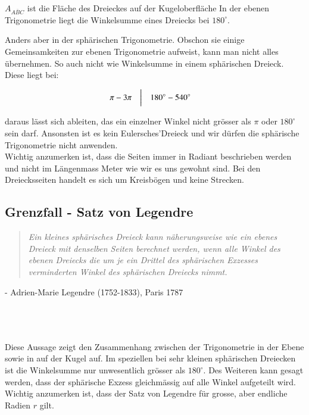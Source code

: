 \begin{refsection}
$A_{ \overline{ ABC }}$ ist die Fläche des Dreieckes auf der Kugeloberfläche
In der ebenen Trigonometrie liegt die Winkelsumme eines Dreiecks bei
$180^{\circ}$.

Anders aber in der sphärischen Trigonometrie. Obschon sie einige Gemeinsamkeiten zur ebenen Trigonometrie aufweist, kann man nicht alles übernehmen.
So auch nicht wie Winkelsumme in einem sphärischen Dreieck.
Diese liegt bei:

\[
\begin{aligned}
\pi
&-
3\pi
&
&\text{\bigg \vert}
&
180^{\circ}
&-
540^{\circ}
\end{aligned}
\]

daraus lässt sich ableiten, das ein einzelner Winkel nicht grösser als $\pi$ oder $180^{\circ}$ sein darf. Ansonsten ist es kein Eulersches’Dreieck und wir dürfen die sphärische Trigonometrie nicht anwenden.\\
Wichtig anzumerken ist, dass die Seiten immer in Radiant
beschrieben werden und nicht im Längenmass Meter wie wir es uns gewohnt sind. 
Bei den Dreiecksseiten handelt es sich um Kreisbögen und keine Strecken.


\subsection{Grenzfall - Satz von Legendre}

\begin{quote} \textit{Ein kleines sphärisches Dreieck kann näherungsweise 
wie ein ebenes Dreieck mit denselben Seiten berechnet 
werden, wenn alle Winkel des ebenen Dreiecks die um 
je ein Drittel des sphärischen Exzesses verminderten 
Winkel des sphärischen Dreiecks nimmt.} \end{quote}
\begin{flushright} - Adrien-Marie Legendre (1752-1833), Paris 1787
\end{flushright}\\
\\
\\
Diese Aussage zeigt den Zusammenhang zwischen der 
Trigonometrie in der Ebene sowie in auf der Kugel
auf. Im speziellen bei sehr kleinen sphärischen 
Dreiecken ist die Winkelsumme nur unwesentlich 
grösser als $180^{\circ}$. Des Weiteren kann gesagt werden,
dass der sphärische Exzess gleichmässig auf alle
Winkel aufgeteilt wird.
Wichtig anzumerken ist, dass der Satz von Legendre 
für grosse, aber endliche Radien $r$ gilt.

%


\end{refsection}
